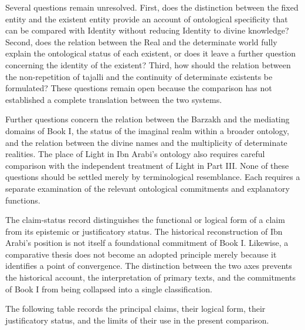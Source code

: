 \label{para:VS.B01.P01.C08.S16.SS18.P001}

Several questions remain unresolved. First,
does the distinction between the fixed entity
and the existent entity provide an account
of ontological specificity that can be
compared with Identity without reducing
Identity to divine knowledge? Second,
does the relation between the Real and
the determinate world fully explain the
ontological status of each existent, or
does it leave a further question concerning
the identity of the existent? Third, how
should the relation between the non-repetition
of tajalli and the continuity of determinate
existents be formulated? These questions
remain open because the comparison has
not established a complete translation
between the two systems.

\label{para:VS.B01.P01.C08.S16.SS18.P002}

Further questions concern the relation
between the Barzakh and the mediating
domains of Book I, the status of the
imaginal realm within a broader ontology,
and the relation between the divine names
and the multiplicity of determinate
realities. The place of Light in Ibn
Arabi's ontology also requires careful
comparison with the independent treatment
of Light in Part III. None of these
questions should be settled merely by
terminological resemblance. Each requires
a separate examination of the relevant
ontological commitments and explanatory
functions.

\label{para:VS.B01.P01.C08.SS18.P003}

The claim-status record distinguishes
the functional or logical form of a claim
from its epistemic or justificatory status.
The historical reconstruction of Ibn
Arabi's position is not itself a
foundational commitment of Book I.
Likewise, a comparative thesis does not
become an adopted principle merely because
it identifies a point of convergence.
The distinction between the two axes
prevents the historical account, the
interpretation of primary texts, and
the commitments of Book I from being
collapsed into a single classification.

\label{para:VS.B01.P01.C08.S16.SS18.P004}

The following table records the principal
claims, their logical form, their
justificatory status, and the limits
of their use in the present comparison.

